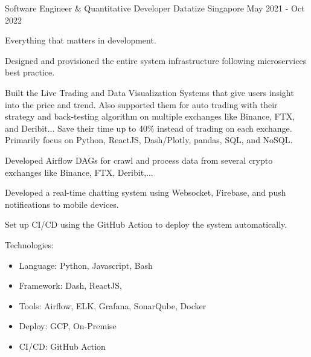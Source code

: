 \begin{cventries}
    \cventry
    {Software Engineer \& Quantitative Developer} %
    {Datatize} %
    {Singapore} %
    {May 2021 - Oct 2022} %
    {
      \begin{cvitems} %
        \item {Everything that matters in development.}
        \item {Designed and provisioned the entire system infrastructure following microservices best practice.}
        \item {Built the Live Trading and Data Visualization Systems that give users insight into the price and trend. Also supported them for auto trading with their strategy and back-testing algorithm on multiple exchanges like Binance, FTX, and Deribit... Save their time up to 40\% instead of trading on each exchange. Primarily focus on Python, ReactJS, Dash/Plotly, pandas, SQL, and NoSQL.}
        \item {Developed Airflow DAGs for crawl and process data from several crypto exchanges like Binance, FTX, Deribit,...}
        \item {Developed a real-time chatting system using Websocket, Firebase, and push notifications to mobile devices.}
        \item {Set up CI/CD using the GitHub Action to deploy the system automatically.}
        \item {Technologies:
          \begin{itemize}
            \item {Language: Python, Javascript, Bash}
            \item {Framework: Dash, ReactJS, }
            \item {Tools: Airflow, ELK, Grafana, SonarQube, Docker}
            \item {Deploy: GCP, On-Premise}
            \item {CI/CD: GitHub Action}
          \end{itemize}
        }
      \end{cvitems}
    }


\end{cventries}
